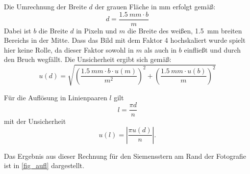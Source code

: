 \documentclass[
	a4paper,
	12pt,
	pagesize,
	ngerman
]{scrartcl}
\begin{document}
	Die Umrechnung der Breite $d$ der grauen Fläche in \si{mm} erfolgt gemäß:
	\begin{equation}
		d = \frac{\SI{1,5}{mm} \cdot b}{m}
	\end{equation}
	Dabei ist $b$ die Breite $d$ in Pixeln und $m$ die Breite des weißen, \SI{1,5}{mm} breiten Bereichs in der Mitte.
	Dass das Bild mit dem Faktor 4 hochskaliert wurde spielt hier keine Rolle, da dieser Faktor sowohl in $m$ als auch in $b$ einfließt und durch den Bruch wegfällt.
	Die Unsicherheit ergibt sich gemäß:
	\begin{equation}
		u(d)=\sqrt{\left(\frac{\SI{1,5}{mm} \cdot b \cdot u(m)}{m^2}\right)^2+\left(\frac{\SI{1,5}{mm} \cdot u(b)}{m}\right)^2}
	\end{equation}
	
	Für die Auflösung in Linienpaaren $l$ gilt
	\begin{equation}
		l=\frac{\pi d}{n}
	\end{equation}
	mit der Unsicherheit
	\begin{equation}
		u(l)=\left|\frac{\pi u(d)}{n}\right|. %
	\end{equation}
	
	Das Ergebnis aus dieser Rechnung für den Siemensstern am Rand der Fotografie ist in \cref{fig_aufl} dargestellt.
	
\end{document}
